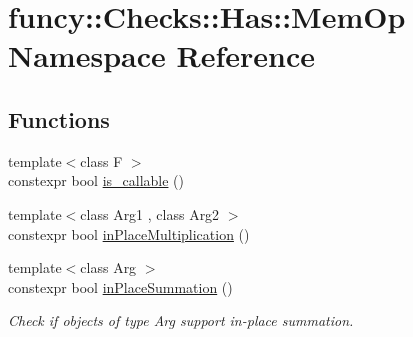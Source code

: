 \hypertarget{namespacefuncy_1_1Checks_1_1Has_1_1MemOp}{\section{funcy\-:\-:Checks\-:\-:Has\-:\-:Mem\-Op Namespace Reference}
\label{namespacefuncy_1_1Checks_1_1Has_1_1MemOp}
}
\subsection*{Functions}
\begin{DoxyCompactItemize}
\item 
{\footnotesize template$<$class F $>$ }\\constexpr bool \hyperlink{namespacefuncy_1_1Checks_1_1Has_1_1MemOp_ac5b464cedfc7447164cf70828d8c8d6d}{is\-\_\-callable} ()
\item 
{\footnotesize template$<$class Arg1 , class Arg2 $>$ }\\constexpr bool \hyperlink{namespacefuncy_1_1Checks_1_1Has_1_1MemOp_af3b2d409a64b3c4d690ceb16ca8101fe}{in\-Place\-Multiplication} ()
\item 
{\footnotesize template$<$class Arg $>$ }\\constexpr bool \hyperlink{namespacefuncy_1_1Checks_1_1Has_1_1MemOp_a4e938bc8fb7a4d6e3a2e77a80d9b2fb4}{in\-Place\-Summation} ()
\begin{DoxyCompactList}\small\item\em Check if objects of type Arg support in-\/place summation. \end{DoxyCompactList}\end{DoxyCompactItemize}


